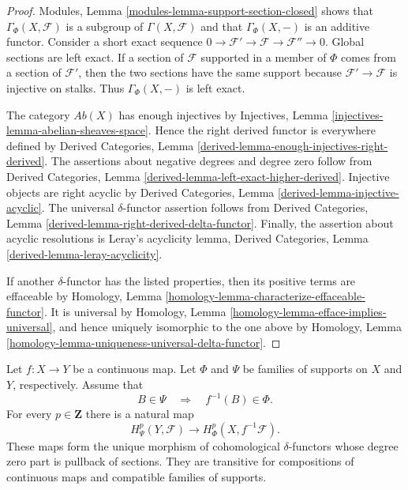 \begin{proof}
Modules, Lemma \ref{modules-lemma-support-section-closed} shows that
$\Gamma_\Phi(X, \mathcal{F})$ is a subgroup of
$\Gamma(X, \mathcal{F})$ and that $\Gamma_\Phi(X, -)$ is an additive
functor.
Consider a short exact sequence
$0 \to \mathcal{F}' \to \mathcal{F} \to \mathcal{F}'' \to 0$.
Global sections are left exact. If a section of $\mathcal{F}$ supported
in a member of $\Phi$ comes from a section of $\mathcal{F}'$, then the
two sections have the same support because
$\mathcal{F}' \to \mathcal{F}$ is injective on stalks. Thus
$\Gamma_\Phi(X, -)$ is left exact.

The category $\textit{Ab}(X)$ has enough injectives by Injectives, Lemma
\ref{injectives-lemma-abelian-sheaves-space}. Hence the right derived
functor is everywhere defined by Derived Categories, Lemma
\ref{derived-lemma-enough-injectives-right-derived}. The assertions about
negative degrees and degree zero follow from Derived Categories, Lemma
\ref{derived-lemma-left-exact-higher-derived}. Injective objects are right
acyclic by Derived Categories, Lemma
\ref{derived-lemma-injective-acyclic}. The universal $\delta$-functor
assertion follows from Derived Categories, Lemma
\ref{derived-lemma-right-derived-delta-functor}. Finally, the assertion
about acyclic resolutions is Leray's acyclicity lemma, Derived Categories,
Lemma \ref{derived-lemma-leray-acyclicity}.

If another $\delta$-functor has the listed properties, then its positive
terms are effaceable by Homology, Lemma
\ref{homology-lemma-characterize-effaceable-functor}. It is universal by
Homology, Lemma
\ref{homology-lemma-efface-implies-universal}, and hence uniquely isomorphic
to the one above by Homology, Lemma
\ref{homology-lemma-uniqueness-universal-delta-functor}.
\end{proof}

\begin{lemma}
\label{lemma-family-supports-pullback}
\begin{reference}
\cite[Chapter III, \S 3.2, Proposition 3.2.2, pp. 157--158]{Tohoku}
\end{reference}
Let $f : X \to Y$ be a continuous map. Let $\Phi$ and $\Psi$ be families
of supports on $X$ and $Y$, respectively. Assume that
$$
B \in \Psi \quad \Longrightarrow \quad f^{-1}(B) \in \Phi.
$$
For every $p \in \mathbf{Z}$ there is a natural map
$$
H^p_\Psi(Y, \mathcal{F}) \longrightarrow
H^p_\Phi(X, f^{-1}\mathcal{F}).
$$
These maps form the unique morphism of cohomological $\delta$-functors
whose degree zero part is pullback of sections. They are transitive for
compositions of continuous maps and compatible families of supports.
\end{lemma}

